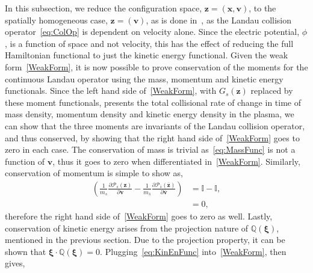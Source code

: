 \documentclass[preprint,12pt]{elsarticle}
\theoremstyle{definition}
\begin{document}
In this subsection, we reduce the configuration space, $\boldsymbol{z}=(\boldsymbol{x},\boldsymbol{v})$, to the spatially homogeneous case, $\boldsymbol{z}=(\boldsymbol{v})$, as is done in~\cite{Carrillo2020,Eero2020}, as the Landau collision operator~\eqref{eq:ColOp} is dependent on velocity alone. Since the electric potential, $\phi$, is a function of space and not velocity, this has the effect of reducing the full Hamiltonian functional to just the kinetic energy functional. Given the weak form~\eqref{WeakForm}, it is now possible to prove conservation of the moments for the continuous Landau operator using the mass, momentum and kinetic energy functionals. Since the left hand side of~\eqref{WeakForm}, with $G_s (\boldsymbol{z})$ replaced by these moment functionals, presents the total collisional rate of change in time of mass density, momentum density and kinetic energy density in the plasma, we can show that the three moments are invariants of the Landau collision operator, and thus conserved, by showing that the right hand side of~\eqref{WeakForm} goes to zero in each case. The conservation of mass is trivial as~\eqref{eq:MassFunc} is not a function of $\boldsymbol{v}$, thus it goes to zero when differentiated in~\eqref{WeakForm}. Similarly, conservation of momentum is simple to show as,
\begin{align*}
\left(\frac{1}{m_{s}} \frac{\partial \mathcal{P}_s (\boldsymbol{z})}{\partial \boldsymbol{v}}-\frac{1}{m_{\bar{s}}} \frac{\partial \mathcal{P}_{\bar{s}}(\overline{\boldsymbol{z}})}{\partial \overline{\boldsymbol{v}}}\right) &= \mathbb{I} - \mathbb{I}, \\
&= 0,
\end{align*}
therefore the right hand side of~\eqref{WeakForm} goes to zero as well. Lastly, conservation of kinetic energy arises from the projection nature of $\mathbb{Q}(\boldsymbol{\xi})$, mentioned in the previous section. Due to the projection property, it can be shown that $\boldsymbol{\xi} \cdot \mathbb{Q}(\boldsymbol{\xi}) = 0$. Plugging~\eqref{eq:KinEnFunc} into~\eqref{WeakForm}, then gives,
\end{document}
